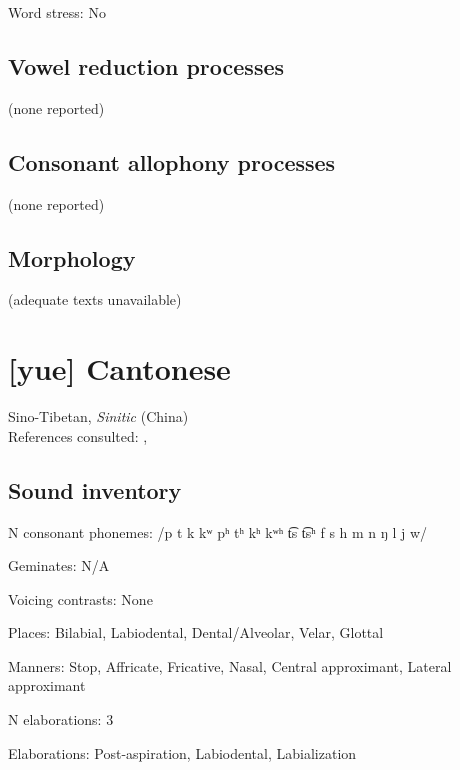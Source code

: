 {\begin{appendixdesc}
\item[Word stress:] No
\end{appendixdesc}
\subsection*{Vowel reduction processes}

(none reported)
\subsection*{Consonant allophony processes}

(none reported) 

\subsection*{Morphology}

(adequate texts unavailable)

\section*{[yue] Cantonese}   %
Sino-Tibetan, \textit{Sinitic} (China)\medskip\\
References consulted: \citet{BauerBenedict1997}, \citet{MatthewsYip1994}

\subsection*{Sound inventory}
\begin{appendixdesc}

\item[N consonant phonemes:] /p t k kʷ pʰ tʰ kʰ kʷʰ t͡s t͡sʰ f s h m n ŋ l j w/

\item[Geminates:] N/A

\item[Voicing contrasts:] None

\item[Places:] Bilabial, Labiodental, Dental/Alveolar, Velar, Glottal

\item[Manners:] Stop, Affricate, Fricative, Nasal, Central approximant, Lateral approximant

\item[N elaborations:] 3

\item[Elaborations:] Post-aspiration, Labiodental, Labialization


\end{appendixdesc}}
